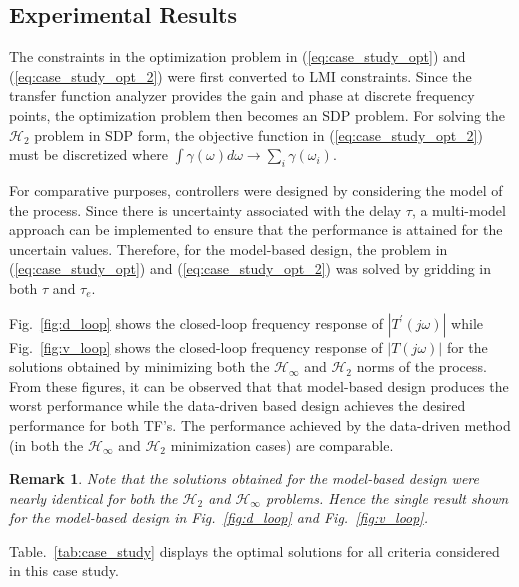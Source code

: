 \documentclass[a4paper, 10pt, conference]{ieeeconf}
\newtheorem*{remark}{Remark}
\begin{document}
\subsection{Experimental Results}
The constraints in the optimization problem in (\ref{eq:case_study_opt}) and (\ref{eq:case_study_opt_2}) were first converted to LMI constraints. Since the transfer function analyzer provides the gain and phase at discrete frequency points, the optimization problem then becomes an SDP problem. For solving the $\mathcal{H}_2$ problem in SDP form, the objective function in (\ref{eq:case_study_opt_2}) must be discretized where $\int \gamma(\omega) d\omega \rightarrow \sum_i \gamma(\omega_i)$.

For comparative purposes, controllers were designed by considering the model of the process.  Since there is uncertainty associated with the delay $\tau$, a multi-model approach can be implemented to ensure that the performance is attained for the uncertain values. Therefore, for the model-based design, the problem in (\ref{eq:case_study_opt}) and (\ref{eq:case_study_opt_2}) was solved by gridding in both $\tau$ and $\tau_e$.

Fig.~\ref{fig:d_loop} shows the closed-loop frequency response of $|T^{\prime}(j\omega)|$ while Fig.~\ref{fig:v_loop} shows the closed-loop frequency response of $|T(j\omega)|$ for the solutions obtained by minimizing both the $\mathcal{H}_{\infty}$ and $\mathcal{H}_2$ norms of the process. From these figures, it can be observed that that model-based design produces the worst performance while the data-driven based design achieves the desired performance for both TF's. The performance achieved by the data-driven method (in both the $\mathcal{H}_{\infty}$ and $\mathcal{H}_2$ minimization cases) are comparable. 

\begin{remark}
Note that the solutions obtained for the model-based design were nearly identical for both the $\mathcal{H}_2$ and $\mathcal{H}_\infty$ problems. Hence the single result shown for the model-based design in Fig.~\ref{fig:d_loop} and Fig.~\ref{fig:v_loop}. 
\end{remark}

Table.~\ref{tab:case_study} displays the optimal solutions for all criteria considered in this case study. 
\end{document}
